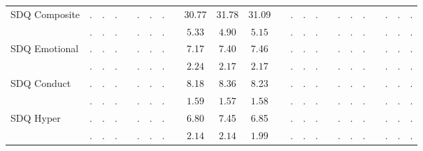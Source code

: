 \begin{center}
{\begin{longtable}{L{12em} c c c p{1.2em} c c c p{1.2em} c c c p{1.2em} c c c p{1.2em} c c c p{1.2em} c c c}
SDQ Composite & . &         . &         . & &         . &         . &         . & &     30.77 &     31.78 &     31.09 & &         . &         . &         . & &         . &         . &         . & &         . &         . &         . \\*
& $\mathit{        .}$ & $\mathit{        .}$ & $\mathit{        .}$ & & $\mathit{        .}$ & $\mathit{        .}$ & $\mathit{        .}$ & & $\mathit{     5.33}$ & $\mathit{     4.90}$ & $\mathit{     5.15}$ & & $\mathit{        .}$ & $\mathit{        .}$ & $\mathit{        .}$ & & $\mathit{        .}$ & $\mathit{        .}$ & $\mathit{        .}$ & & $\mathit{        .}$ & $\mathit{        .}$ & $\mathit{        .}$ \\[.7em]
SDQ Emotional & . &         . &         . & &         . &         . &         . & &      7.17 &      7.40 &      7.46 & &         . &         . &         . & &         . &         . &         . & &         . &         . &         . \\*
& $\mathit{        .}$ & $\mathit{        .}$ & $\mathit{        .}$ & & $\mathit{        .}$ & $\mathit{        .}$ & $\mathit{        .}$ & & $\mathit{     2.24}$ & $\mathit{     2.17}$ & $\mathit{     2.17}$ & & $\mathit{        .}$ & $\mathit{        .}$ & $\mathit{        .}$ & & $\mathit{        .}$ & $\mathit{        .}$ & $\mathit{        .}$ & & $\mathit{        .}$ & $\mathit{        .}$ & $\mathit{        .}$ \\[.7em]
SDQ Conduct & . &         . &         . & &         . &         . &         . & &      8.18 &      8.36 &      8.23 & &         . &         . &         . & &         . &         . &         . & &         . &         . &         . \\*
& $\mathit{        .}$ & $\mathit{        .}$ & $\mathit{        .}$ & & $\mathit{        .}$ & $\mathit{        .}$ & $\mathit{        .}$ & & $\mathit{     1.59}$ & $\mathit{     1.57}$ & $\mathit{     1.58}$ & & $\mathit{        .}$ & $\mathit{        .}$ & $\mathit{        .}$ & & $\mathit{        .}$ & $\mathit{        .}$ & $\mathit{        .}$ & & $\mathit{        .}$ & $\mathit{        .}$ & $\mathit{        .}$ \\[.7em]
SDQ Hyper & . &         . &         . & &         . &         . &         . & &      6.80 &      7.45 &      6.85 & &         . &         . &         . & &         . &         . &         . & &         . &         . &         . \\*
& $\mathit{        .}$ & $\mathit{        .}$ & $\mathit{        .}$ & & $\mathit{        .}$ & $\mathit{        .}$ & $\mathit{        .}$ & & $\mathit{     2.14}$ & $\mathit{     2.14}$ & $\mathit{     1.99}$ & & $\mathit{        .}$ & $\mathit{        .}$ & $\mathit{        .}$ & & $\mathit{        .}$ & $\mathit{        .}$ & $\mathit{        .}$ & & $\mathit{        .}$ & $\mathit{        .}$ & $\mathit{        .}$ \\[.7em]

\end{longtable}}
\end{center}
